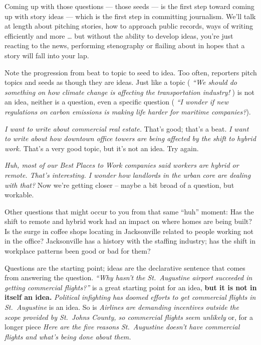 \documentclass[
  11pt,
  american,
  letterpaperpaper,
  extrafontsizes,onecolumn,openright
  ]{memoir}
\newlength{\rf}
\begin{document}
Coming up with those questions --- those seeds --- is the first step toward coming up with story ideas --- which is the first step in committing journalism. We'll talk at length about pitching stories, how to approach public records, ways of writing efficiently and more \ldots{} but without the ability to develop ideas, you're just reacting to the news, performing stenography or flailing about in hopes that a story will fall into your lap.

Note the progression from beat to topic to seed to idea. Too often, reporters pitch topics and seeds as though they are ideas. Just like a topic ( \emph{``We should do something on how climate change is affecting the transportation industry!} ) is not an idea, neither is a question, even a specific question ( \emph{``I wonder if new regulations on carbon emissions is making life harder for maritime companies?}).

\emph{I want to write about commercial real estate.} That's good; that's a beat. \emph{I want to write about how downtown office towers are being affected by the shift to hybrid work.} That's a very good topic, but it's not an idea. Try again.

\emph{Huh, most of our Best Places to Work companies said workers are hybrid or remote. That's interesting. I wonder how landlords in the urban core are dealing with that?} Now we're getting closer -- maybe a bit broad of a question, but workable.

Other questions that might occur to you from that same \enquote{huh} moment: Has the shift to remote and hybrid work had an impact on where homes are being built? Is the surge in coffee shops locating in Jacksonville related to people working not in the office? Jacksonville has a history with the staffing industry; has the shift in workplace patterns been good or bad for them?

Questions are the starting point; ideas are the declarative sentence that comes from answering the question. \emph{\enquote{Why hasn't the St.~Augustine airport succeeded in getting commercial flights?}} is a great starting point for an idea, \textbf{but it is not in itself an idea.} \emph{Political infighting has doomed efforts to get commercial flights in St.~Augustine} is an idea. So is \emph{Airlines are demanding incentives outside the scope provided by St.~Johns County, so commercial flights seem unlikely} or, for a longer piece \emph{Here are the five reasons St.~Augustine doesn't have commercial flights and what's being done about them.}
\end{document}
